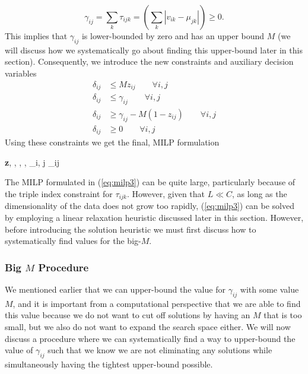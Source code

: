 \documentclass[../thesis.tex]{subfiles}
\begin{document}
\begin{equation*}
    \gamma_{ij} = \sum_k \tau_{ijk} = \left(\sum_k |v_{ik} - \mu_{jk}|\right) \geq 0.
\end{equation*}
This implies that $\gamma_{ij}$ is lower-bounded by zero and has an upper bound $M$ (we will discuss how we systematically go about finding this upper-bound later in this section). Consequently, we introduce the new constraints and auxiliary decision variables
\begin{align}
    \delta_{ij} &\leq Mz_{ij} \quad \quad \forall i, j \\
    \delta_{ij} &\leq \gamma_{ij} \quad \quad \forall i,j \\
    \delta_{ij} &\geq \gamma_{ij} - M(1-z_{ij}) \quad \quad \forall i, j \\
    \delta_{ij} &\geq 0 \quad \quad \forall i, j
\end{align}
Using these constraints we get the final, MILP formulation
\begin{mini!}
	{\textbf{z}, \boldsymbol{\mu}, \boldsymbol{\tau}, \boldsymbol{\gamma}, \boldsymbol{\delta}}{\sum_{i, j} \delta_{ij}}
	{\label{eq:milp3}}{}
\end{mini!}
The MILP formulated in (\ref{eq:milp3}) can be quite large, particularly because of the triple index constraint for $\tau_{ijk}$. However, given that $L \ll C$, as long as the dimensionality of the data does not grow too rapidly, (\ref{eq:milp3}) can be solved by employing a linear relaxation heuristic discussed later in this section. However, before introducing the solution heuristic we must first discuss how to systematically find values for the big-$M$. 

\subsubsection{Big $M$ Procedure}
We mentioned earlier that we can upper-bound the value for $\gamma_{ij}$ with some value $M$, and it is important from a computational perspective that we are able to find this value because we do not want to cut off solutions by having an $M$ that is too small, but we also do not want to expand the search space either. We will now discuss a procedure where we can systematically find a way to upper-bound the value of $\gamma_{ij}$ such that we know we are not eliminating any solutions while simultaneously having the tightest upper-bound possible.
\end{document}
